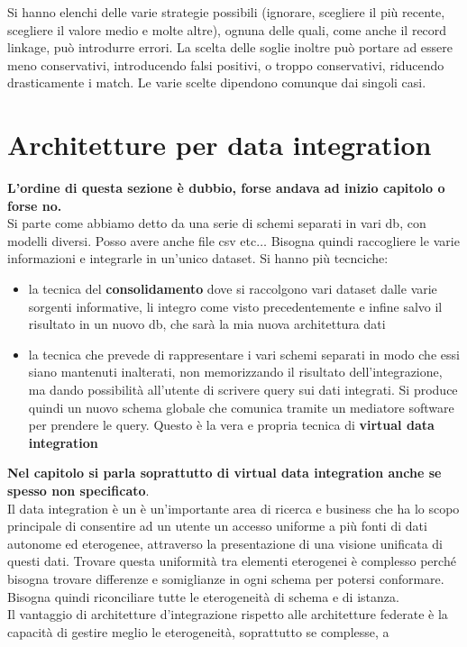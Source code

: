 \documentclass[a4paper,12pt, oneside]{book}
\begin{document}
Si hanno elenchi delle varie strategie possibili (ignorare, scegliere il più
recente, scegliere il valore medio e molte altre), ognuna delle quali, come
anche il record linkage, può introdurre errori. La scelta delle soglie inoltre
può portare ad essere meno conservativi, introducendo falsi positivi, o troppo
conservativi, riducendo drasticamente i match. Le varie scelte dipendono
comunque dai singoli casi.
\section{Architetture per data integration}
\textbf{L'ordine di questa sezione è dubbio, forse andava ad inizio capitolo o
  forse no.}\\
Si parte come abbiamo detto da una serie di schemi separati in vari db, con
modelli diversi. Posso avere anche file csv etc$\ldots$ Bisogna quindi
raccogliere le varie informazioni e integrarle in un'unico dataset. Si hanno più
tecnciche:
\begin{itemize}
  \item la tecnica del \textbf{consolidamento} dove si raccolgono vari dataset
  dalle varie sorgenti informative, li integro come visto precedentemente e
  infine salvo il risultato in un nuovo db, che sarà la mia nuova architettura
  dati 
  \item la tecnica che prevede di rappresentare i vari schemi separati in modo
  che essi siano mantenuti inalterati, non memorizzando il risultato
  dell'integrazione, ma dando possibilità all'utente di scrivere query sui dati
  integrati. Si produce quindi un nuovo schema globale che comunica tramite un
  mediatore software per prendere le query. Questo è la vera e propria tecnica
  di \textbf{virtual data integration}
\end{itemize}
\textbf{Nel capitolo si parla soprattutto di virtual data integration anche se
  spesso non specificato}.\\
Il data integration è un è un'importante area di ricerca e business che ha lo
scopo principale di consentire ad un utente un accesso uniforme a più
fonti di dati autonome ed eterogenee, attraverso la presentazione di una visione
unificata di questi dati. Trovare questa uniformità tra elementi eterogenei è
complesso perché bisogna trovare differenze e somiglianze in ogni schema per
potersi conformare. Bisogna quindi riconciliare tutte le eterogeneità di schema
e di istanza.\\
Il vantaggio di architetture d'integrazione rispetto alle architetture federate
è la capacità di gestire meglio le eterogeneità, soprattutto se complesse, a
\end{document}
